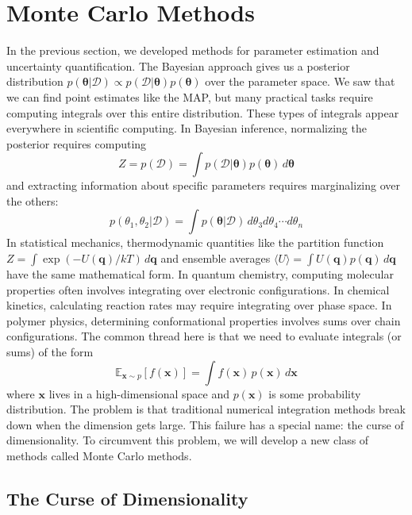 \chapter{Monte Carlo Methods}
\label{sec:monte-carlo}
In the previous section, we developed methods for parameter estimation and uncertainty quantification. The Bayesian approach gives us a posterior distribution $p(\boldsymbol{\theta}|\mathcal{D}) \propto p(\mathcal{D}|\boldsymbol{\theta})p(\boldsymbol{\theta})$ over the parameter space. We saw that we can find point estimates like the MAP, but many practical tasks require computing integrals over this entire distribution. These types of integrals appear everywhere in scientific computing. In Bayesian inference, normalizing the posterior requires computing
\begin{equation}
    Z = p(\mathcal{D}) = \int p(\mathcal{D}|\boldsymbol{\theta}) p(\boldsymbol{\theta}) \, d\boldsymbol{\theta}
\end{equation}
and extracting information about specific parameters requires marginalizing over the others:
\begin{equation}
    p(\theta_1, \theta_2 | \mathcal{D}) = \int p(\boldsymbol{\theta}|\mathcal{D}) \, d\theta_3 d\theta_4 \cdots d\theta_n
\end{equation}
In statistical mechanics, thermodynamic quantities like the partition function $Z = \int \exp(-U(\mathbf{q})/kT) \, d\mathbf{q}$ and ensemble averages $\langle U \rangle = \int U(\mathbf{q}) p(\mathbf{q}) \, d\mathbf{q}$ have the same mathematical form. In quantum chemistry, computing molecular properties often involves integrating over electronic configurations. In chemical kinetics, calculating reaction rates may require integrating over phase space. In polymer physics, determining conformational properties involves sums over chain configurations. The common thread here is that we need to evaluate integrals (or sums) of the form
\begin{equation}
    \mathbb{E}_{\mathbf{x} \sim p}[f(\mathbf{x})] = \int f(\mathbf{x}) \, p(\mathbf{x}) \, d\mathbf{x}
\end{equation}
where $\mathbf{x}$ lives in a high-dimensional space and $p(\mathbf{x})$ is some probability distribution. The problem is that traditional numerical integration methods break down when the dimension gets large. This failure has a special name: the curse of dimensionality. To circumvent this problem, we will develop a new class of methods called Monte Carlo methods.

\section{The Curse of Dimensionality}

